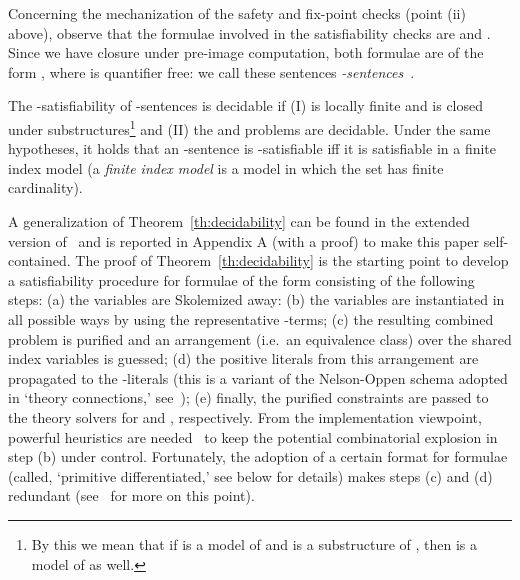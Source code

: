 \documentclass{LMCS}
\theoremstyle{plain}\newtheorem{assumption}[thm]{Assumption}
\theoremstyle{plain}\newtheorem{proposition}[thm]{Proposition}
\theoremstyle{plain}\newtheorem{property}[thm]{Property}
\theoremstyle{plain}\newtheorem{example}[thm]{Example}
\theoremstyle{plain}\newtheorem{claim}[thm]{Claim}
\theoremstyle{plain}\newtheorem{lemma}[thm]{Lemma}
\begin{document}
Concerning the mechanization of the safety and fix-point checks (point
(ii) above), observe that the formulae involved in the satisfiability
checks are  and
.  Since we have
closure under pre-image computation, both formulae are of the form , where  is quantifier free: we call these sentences
\emph{-sentences}~\cite{ijcar08}.
 \begin{thm}\label{th:decidability}
   The -satisfiability of -sentences is
   decidable if (I)  is locally finite and is closed under
   substructures\footnote{
By this we mean that if  is a model of  and  is a
     substructure of , then  is a model of  as well.  }
   and (II) the  and  problems are
   decidable. Under the same hypotheses, it holds that an
   -sentence is -satisfiable iff it is
   satisfiable in a finite index model (a \emph{finite index model} is
   a model  in which the set  has finite
   cardinality).
\end{thm}
A generalization of Theorem~\ref{th:decidability} can be found in the
extended version of~\cite{ijcar08} and is reported in Appendix A (with
a proof) to make this paper self-contained.  The proof of
Theorem~\ref{th:decidability} is the starting point to develop a
satisfiability procedure for formulae of the form 
consisting of the following steps: (a) the variables  are
Skolemized away: (b) the variables  are instantiated in all
possible ways by using the representative -terms; (c) the
resulting combined problem is purified and an arrangement (i.e.\ an
equivalence class) over the shared index variables is guessed; (d) the
positive literals from this arrangement are propagated to the
-literals (this is a variant of the Nelson-Oppen schema adopted
in `theory connections,' see~\cite{BaGh}); (e) finally, the purified
constraints are passed to the theory solvers for  and ,
respectively.  From the implementation viewpoint, powerful heuristics
are needed~\cite{afm09} to keep the potential combinatorial explosion
in step (b) under control.  Fortunately, the adoption of a certain
format for formulae (called, `primitive differentiated,' see below for
details) makes steps (c) and (d) redundant (see~\cite{afm09} for more
on this point).
\end{document}
